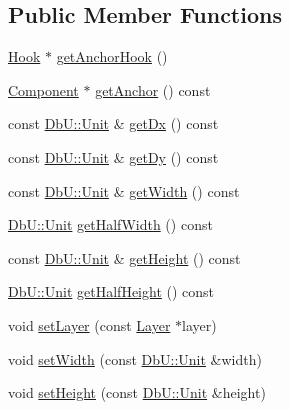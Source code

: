 \subsection*{Public Member Functions}
\begin{DoxyCompactItemize}
\item 
\hyperlink{classHurricane_1_1Hook}{Hook} $\ast$ \hyperlink{classHurricane_1_1Contact_a300306b006397377bc9a54ea783c1150}{get\-Anchor\-Hook} ()
\item 
\hyperlink{classHurricane_1_1Component}{Component} $\ast$ \hyperlink{classHurricane_1_1Contact_acb3f00af2f60dbfb16745750a555ef11}{get\-Anchor} () const 
\item 
const \hyperlink{group__DbUGroup_ga4fbfa3e8c89347af76c9628ea06c4146}{Db\-U\-::\-Unit} \& \hyperlink{classHurricane_1_1Contact_ada39a4bbc6b0ef865ea500d5715fda66}{get\-Dx} () const 
\item 
const \hyperlink{group__DbUGroup_ga4fbfa3e8c89347af76c9628ea06c4146}{Db\-U\-::\-Unit} \& \hyperlink{classHurricane_1_1Contact_a9209de187e96f8880b5aba6af135dcdb}{get\-Dy} () const 
\item 
const \hyperlink{group__DbUGroup_ga4fbfa3e8c89347af76c9628ea06c4146}{Db\-U\-::\-Unit} \& \hyperlink{classHurricane_1_1Contact_a400c68d21437554b2c2a5512c3d744ed}{get\-Width} () const 
\item 
\hyperlink{group__DbUGroup_ga4fbfa3e8c89347af76c9628ea06c4146}{Db\-U\-::\-Unit} \hyperlink{classHurricane_1_1Contact_a589141349c2df1a1206b4da6c8bf866f}{get\-Half\-Width} () const 
\item 
const \hyperlink{group__DbUGroup_ga4fbfa3e8c89347af76c9628ea06c4146}{Db\-U\-::\-Unit} \& \hyperlink{classHurricane_1_1Contact_adda94e729b6a4f232f4333905f95c5ac}{get\-Height} () const 
\item 
\hyperlink{group__DbUGroup_ga4fbfa3e8c89347af76c9628ea06c4146}{Db\-U\-::\-Unit} \hyperlink{classHurricane_1_1Contact_ae39a6b67eb2b8545835e2b7cdeb9d6fc}{get\-Half\-Height} () const 
\item 
void \hyperlink{classHurricane_1_1Contact_a147644849f33bc4d58b6b997543c8306}{set\-Layer} (const \hyperlink{classHurricane_1_1Layer}{Layer} $\ast$layer)
\item 
void \hyperlink{classHurricane_1_1Contact_aae6d5c96862fd6c834ff4abd61edc86f}{set\-Width} (const \hyperlink{group__DbUGroup_ga4fbfa3e8c89347af76c9628ea06c4146}{Db\-U\-::\-Unit} \&width)
\item 
void \hyperlink{classHurricane_1_1Contact_a2fc2e7c85dc5495810544c48bb604712}{set\-Height} (const \hyperlink{group__DbUGroup_ga4fbfa3e8c89347af76c9628ea06c4146}{Db\-U\-::\-Unit} \&height)

\end{DoxyCompactItemize}
